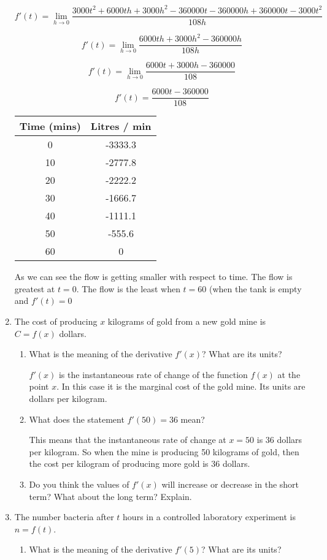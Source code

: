 \documentclass{article}
\begin{document}
\begin{enumerate}
				$$f'(t) = \lim \limits _{h \to 0} \frac{3000t^2 + 6000th + 3000h^2 - 360000t - 360000h + 360000t - 3000t^2}{108h}$$

				$$f'(t) = \lim \limits _{h \to 0} \frac{6000th + 3000h^2 - 360000h}{108h}$$

				$$f'(t) = \lim \limits _{h \to 0} \frac{6000t + 3000h - 360000}{108}$$

				$$f'(t) = \frac{6000t - 360000}{108}$$

				\begin{tabular}{|c|c|}
				
					\hline Time (mins) & Litres / min \\
					\hline 0 & -3333.3 \\
					\hline 10 & -2777.8 \\
					\hline 20 & -2222.2 \\
					\hline 30 & -1666.7 \\
					\hline 40 & -1111.1 \\
					\hline 50 & -555.6 \\
					\hline 60 & 0 \\
					\hline
				\end{tabular}

				As we can see the flow is getting smaller with respect to time. The
				flow is greatest at $t = 0$. The flow is the least when $t = 60$ (when the
				tank is empty and $f'(t) = 0$

			\item The cost of producing $x$ kilograms of gold from a new gold mine
				is $C= f(x)$ dollars.

			\begin{enumerate}
				\item What is the meaning of the derivative $f'(x)$? What are its units?

					$f'(x)$ is the instantaneous rate of change of the function $f(x)$ at
					the point $x$. In this case it is the marginal cost of the gold mine.
					Its units are dollars per kilogram.

				\item What does the statement $f'(50) = 36$ mean?

					This means that the instantaneous rate of change at $x = 50$ is
					36 dollars per kilogram. So when the mine is producing 50 kilograms
					of gold, then the cost per kilogram of producing more gold is 
					36 dollars.

				\item Do you think the values of $f'(x)$ will increase or decrease in the
					short term? What about the long term? Explain.
			\end{enumerate}

			\item The number bacteria after $t$ hours in a controlled laboratory experiment
				is $n = f(t)$.

			\begin{enumerate}
				\item What is the meaning of the derivative $f'(5)$? What are its units?

			
			\end{enumerate}

	\end{enumerate}
\end{document}
